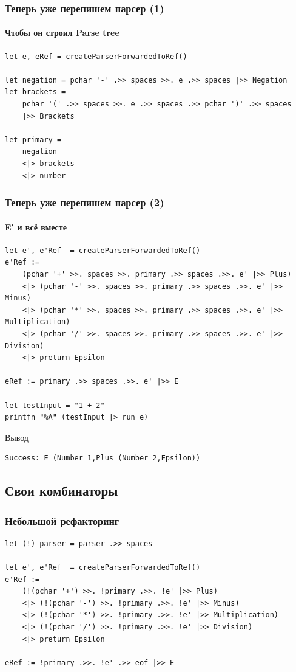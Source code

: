\documentclass[xetex,mathserif,serif]{beamer}
\begin{document}
    \begin{frame}[fragile]
        \frametitle{Теперь уже перепишем парсер (1)}
        \framesubtitle{Чтобы он строил Parse tree}
        \begin{verbatim}
let e, eRef = createParserForwardedToRef()

let negation = pchar '-' .>> spaces >>. e .>> spaces |>> Negation
let brackets = 
    pchar '(' .>> spaces >>. e .>> spaces .>> pchar ')' .>> spaces
    |>> Brackets

let primary = 
    negation
    <|> brackets
    <|> number

        \end{verbatim}
    \end{frame}

    \begin{frame}[fragile]
        \frametitle{Теперь уже перепишем парсер (2)}
        \framesubtitle{E' и всё вместе}
        \begin{small}
            \begin{verbatim}
let e', e'Ref  = createParserForwardedToRef()
e'Ref := 
    (pchar '+' >>. spaces >>. primary .>> spaces .>>. e' |>> Plus)
    <|> (pchar '-' >>. spaces >>. primary .>> spaces .>>. e' |>> Minus)
    <|> (pchar '*' >>. spaces >>. primary .>> spaces .>>. e' |>> Multiplication)
    <|> (pchar '/' >>. spaces >>. primary .>> spaces .>>. e' |>> Division)
    <|> preturn Epsilon

eRef := primary .>> spaces .>>. e' |>> E

let testInput = "1 + 2"
printfn "%A" (testInput |> run e)
            \end{verbatim}

            \begin{exampleblock}{Вывод}
                \begin{verbatim}
Success: E (Number 1,Plus (Number 2,Epsilon))
                \end{verbatim}
            \end{exampleblock}
        \end{small}
    \end{frame}

    \subsection{Свои комбинаторы}

    \begin{frame}[fragile]
        \frametitle{Небольшой рефакторинг}
        \begin{verbatim}
let (!) parser = parser .>> spaces

let e', e'Ref  = createParserForwardedToRef()
e'Ref := 
    (!(pchar '+') >>. !primary .>>. !e' |>> Plus)
    <|> (!(pchar '-') >>. !primary .>>. !e' |>> Minus)
    <|> (!(pchar '*') >>. !primary .>>. !e' |>> Multiplication)
    <|> (!(pchar '/') >>. !primary .>>. !e' |>> Division)
    <|> preturn Epsilon

eRef := !primary .>>. !e' .>> eof |>> E
        \end{verbatim}
    \end{frame}
\end{document}
